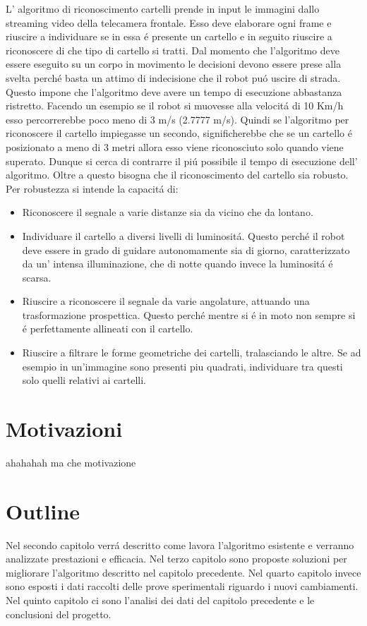 	L' algoritmo di riconoscimento cartelli prende in input le immagini dallo streaming video della telecamera frontale. Esso deve elaborare ogni frame e riuscire a individuare se in essa \'e presente un cartello e in seguito riuscire a riconoscere di che tipo di cartello si tratti.
	Dal momento che l'algoritmo deve essere eseguito su un corpo in movimento le decisioni devono essere prese alla svelta perch\'e basta un attimo di indecisione che il robot pu\'o uscire di strada. Questo impone che l'algoritmo deve avere un tempo di esecuzione abbastanza ristretto. Facendo un esempio se il robot si muovesse alla velocit\'a di 10 Km/h esso percorrerebbe poco meno di 3 m/s (2.7777 m/s). Quindi se l'algoritmo per riconoscere il cartello impiegasse un secondo, significherebbe che se un cartello \'e posizionato a meno di 3 metri allora esso viene riconosciuto  solo quando viene superato. Dunque si cerca di contrarre il pi\'u possibile il tempo di esecuzione dell' algoritmo. Oltre a questo bisogna che il riconoscimento del cartello sia robusto. Per robustezza si intende la capacit\'a di:
		\begin{itemize}
		\item Riconoscere il segnale a varie distanze sia da vicino che da lontano.
		\item Individuare il cartello a diversi livelli di luminosit\'a. Questo perch\'e il robot deve essere in grado di guidare autonomamente sia di giorno, caratterizzato da un' intensa illuminazione, che di notte quando invece la luminosit\'a \'e scarsa.
		\item Riuscire a riconoscere il segnale da varie angolature, attuando una trasformazione prospettica. Questo perch\'e mentre si \'e in moto non sempre si \'e perfettamente allineati con il cartello. 
		\item Riuscire a filtrare le forme geometriche dei cartelli, tralasciando le altre. Se ad esempio in un'immagine sono presenti piu quadrati, individuare tra questi solo quelli relativi ai cartelli.
	\end{itemize}

\section{Motivazioni}
	ahahahah ma che motivazione

\section{Outline}
	Nel secondo capitolo verr\'a descritto come lavora l'algoritmo esistente e verranno analizzate prestazioni e efficacia.
	Nel terzo capitolo sono proposte soluzioni per migliorare l'algoritmo descritto nel capitolo precedente.
	Nel quarto  capitolo invece sono esposti i dati raccolti delle prove sperimentali riguardo i nuovi cambiamenti. Nel quinto capitolo ci sono l'analisi dei dati del capitolo precedente e le conclusioni del progetto.

















